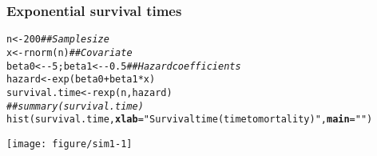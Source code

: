 \documentclass[color=usenames,dvipsnames]{beamer}\usepackage[]{graphicx}\usepackage[]{xcolor}
\makeatletter
\newcommand{\hlnum}[1]{\textcolor[rgb]{0.69,0.494,0}{#1}}%
\newcommand{\hlsng}[1]{\textcolor[rgb]{0.749,0.012,0.012}{#1}}%
\newcommand{\hlcom}[1]{\textcolor[rgb]{0.514,0.506,0.514}{\textit{#1}}}%
\newcommand{\hlopt}[1]{\textcolor[rgb]{0,0,0}{#1}}%
\newcommand{\hldef}[1]{\textcolor[rgb]{0,0,0}{#1}}%
\newcommand{\hlkwb}[1]{\textcolor[rgb]{0,0.341,0.682}{#1}}%
\newcommand{\hlkwc}[1]{\textcolor[rgb]{0,0,0}{\textbf{#1}}}%
\newcommand{\hlkwd}[1]{\textcolor[rgb]{0.004,0.004,0.506}{#1}}%
\newenvironment{kframe}{%
 \def\at@end@of@kframe{}%
 \ifinner\ifhmode%
  \def\at@end@of@kframe{\end{minipage}}%
  \begin{minipage}{\columnwidth}%
 \fi\fi%
 \def\FrameCommand##1{\hskip\@totalleftmargin \hskip-\fboxsep
 \colorbox{shadecolor}{##1}\hskip-\fboxsep
     \hskip-\linewidth \hskip-\@totalleftmargin \hskip\columnwidth}%
 \MakeFramed {\advance\hsize-\width
   \@totalleftmargin\z@ \linewidth\hsize
   \@setminipage}}%
 {\par\unskip\endMakeFramed%
 \at@end@of@kframe}
\newenvironment{knitrout}{}{} %
\makeatother
\begin{document}
\begin{frame}[fragile]
  \frametitle{Exponential survival times}
\begin{knitrout}\scriptsize
{}\color{fgcolor}\begin{kframe}
\begin{alltt}
\hldef{n} \hlkwb{<-} \hlnum{200}                          \hlcom{## Sample size}
\hldef{x} \hlkwb{<-} \hlkwd{rnorm}\hldef{(n)}                     \hlcom{## Covariate}
\hldef{beta0} \hlkwb{<-} \hlopt{-}\hlnum{5}\hldef{; beta1} \hlkwb{<-} \hlopt{-}\hlnum{0.5}        \hlcom{## Hazard coefficients}
\hldef{hazard} \hlkwb{<-} \hlkwd{exp}\hldef{(beta0} \hlopt{+} \hldef{beta1}\hlopt{*}\hldef{x)}
\hldef{survival.time} \hlkwb{<-} \hlkwd{rexp}\hldef{(n, hazard)}
\hlcom{## summary(survival.time)}
\hlkwd{hist}\hldef{(survival.time,} \hlkwc{xlab}\hldef{=}\hlsng{"Survival time (time to mortality)"}\hldef{,} \hlkwc{main}\hldef{=}\hlsng{""}\hldef{)}
\end{alltt}
\end{kframe}

{\centering \texttt{[image: figure/sim1-1]} 

}


\end{knitrout}
\end{frame}



\end{document}
